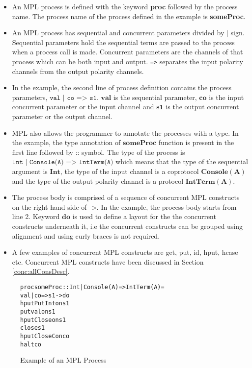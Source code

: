 \documentclass[11pt]{article}
\newcommand{\<}{\langle}
\renewcommand{\>}{\rangle}
\begin{document}
\begin {itemize}
  \item An MPL process is defined with the keyword {\bf proc} followed by the process name. The process name of the process defined in the example is {\bf someProc}.
  \item An MPL process has sequential and concurrent parameters divided by $\mathbf{\mid}$ sign. Sequential parameters hold the sequential terms are passed to the process when a process call is made. Concurrent parameters are the channels of that process which can be both input and output. \texttt{=>} separates the input polarity channels from the output polarity channels.
  \item In the example, the second line of process definition contains the process parameters, $\texttt{val~|~co~=>~s1}$. $\mathbf{val}$ is the sequential parameter, $\mathbf{co}$ is the input concurrent parameter or the input channel and $\mathbf{s1}$ is the output concurrent parameter or the output channel.  
  \item MPL also allows the programmer to annotate the processes with a type. In the example, the type annotation of $\mathbf{someProc}$ function is present in the first line followed by $\texttt{::}$ symbol. The type of the process is $\texttt{Int |~Console(A) => IntTerm(A)}$ which means that the type of the sequential argument is $\mathbf{Int}$, the type of the input channel is a coprotocol $\mathbf{Console(A)}$ and the type of the output polarity channel is a protocol $\mathbf{IntTerm(A)}$.
  \item The process body is comprised of a sequence of concurrent MPL constructs on the right hand side of $\texttt{->}$. In the example, the process body starts from line 2. Keyword $\mathbf {do}$ is used to define a layout for the the concurrent constructs underneath it, i.e the concurrent constructs can be grouped using alignment and using curly braces is not required. 
  \item A few examples of concurrent MPL constructs are {\sf get, put, id, hput, hcase} etc. Concurrent MPL constructs have been discussed in Section \ref {conc:allConsDesc}.
\end {itemize}

 
\begin{figure}[!h]
\begin{alltt}


            proc someProc :: Int | Console (A) => IntTerm (A) = 
                val | co => s1 -> do 
                    hput PutInt on s1 
                    put val on s1
                    hput Close on s1 
                    close s1
                    hput CloseC on co
                    halt co

\end{alltt}
\caption{Example of an MPL Process} 
\label{fig:Conc_MPLProcs}\end{figure}
\end{document}
